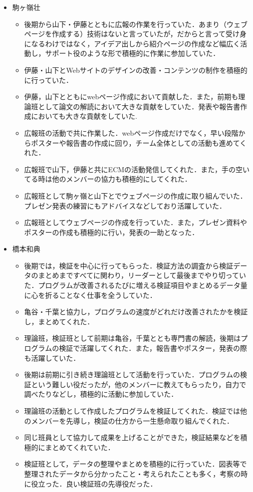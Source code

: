 \documentclass[openany,11pt,papersize]{jsbook}
\begin{document}
\begin{itemize}
\item 駒ヶ嶺壮
\begin{itemize}
\item 後期から山下・伊藤とともに広報の作業を行っていた．あまり（ウェブページを作成する）技術はないと言っていたが，だからと言って受け身になるわけではなく，アイデア出しから紹介ページの作成など幅広く活動し，サポート役のような形で積極的に作業に参加していた．
\item 伊藤・山下とWebサイトのデザインの改善・コンテンツの制作を積極的に行っていた．
\item 伊藤，山下とともにwebページ作成において貢献した．また，前期も理論班として論文の解読において大きな貢献をしていた．発表や報告書作成においても大きな貢献をしていた.
\item 広報班の活動で共に作業した．webページ作成だけでなく，早い段階からポスターや報告書の作成に回り，チーム全体としての活動も進めてくれた．
\item 広報班で山下，伊藤と共にECMの活動発信してくれた．また，手の空いてる時は他のメンバーの協力も積極的にしてくれた．
\item 広報班として駒ヶ嶺と山下とでウェブページの作成に取り組んでいた．プレゼン発表の練習にもアドバイスなどしており活躍していた．
\item 広報班としてウェブページの作成を行っていた．また，プレゼン資料やポスターの作成も積極的に行い，発表の一助となった．
\end{itemize}

\item 橋本和典
\begin{itemize}
\item 後期では，検証を中心に行ってもらった．検証方法の調査から検証データのまとめまですべてに関わり，リーダーとして最後までやり切っていた．プログラムが改善されるたびに増える検証項目やまとめるデータ量に心を折ることなく仕事を全うしていた．
\item 亀谷・千葉と協力し，プログラムの速度がどれだけ改善されたかを検証し，まとめてくれた．
\item 理論班，検証班として前期は亀谷，千葉ととも専門書の解読，後期はプログラムの検証で活躍してくれた．また，報告書やポスター，発表の際も活躍していた．
\item 後期は前期に引き続き理論班として活動を行っていた．プログラムの検証という難しい役だったが，他のメンバーに教えてもらったり，自力で調べたりなどし，積極的に活動に参加していた．
\item 理論班の活動として作成したプログラムを検証してくれた．検証では他のメンバーを先導し，検証の仕方から一生懸命取り組んでくれた．
\item 同じ班員として協力して成果を上げることができた，検証結果などを積極的にまとめてくれていた．
\item 検証班として，データの整理やまとめを積極的に行っていた．図表等で整理されたデータから分かったこと・考えられたことも多く，考察の時に役立った．良い検証班の先導役だった．
\end{itemize}


\end{itemize}
\end{document}
